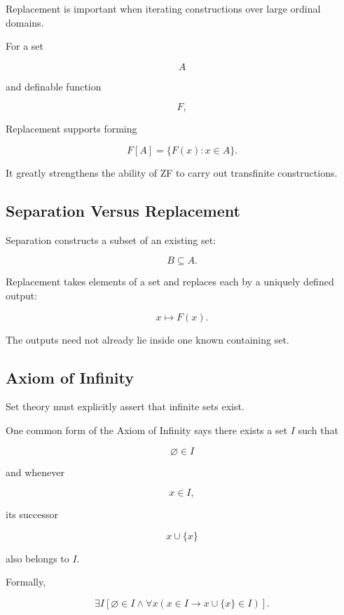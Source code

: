 Replacement is important when iterating constructions over large ordinal
domains.

For a set

\[
A
\]

and definable function

\[
F,
\]

Replacement supports forming

\[
\boxed{
F[A]
=
\{F(x):x\in A\}.
}
\]

It greatly strengthens the ability of ZF to carry out transfinite
constructions.

\subsection{Separation Versus Replacement}
\label{subsec:separation-vs-replacement}

Separation constructs a subset of an existing set:

\[
\boxed{
B
\subseteq
A.
}
\]

Replacement takes elements of a set and replaces each by a uniquely
defined output:

\[
\boxed{
x
\mapsto
F(x).
}
\]

The outputs need not already lie inside one known containing set.

\subsection{Axiom of Infinity}
\label{subsec:axiom-infinity}

Set theory must explicitly assert that infinite sets exist.

One common form of the Axiom of Infinity says there exists a set \(I\) such
that

\[
\boxed{
\varnothing\in I
}
\]

and whenever

\[
x\in I,
\]

its successor

\[
\boxed{
x\cup\{x\}
}
\]

also belongs to \(I\).

Formally,

\[
\boxed{
\exists I
\left[
\varnothing\in I
\land
\forall x
\left(
x\in I
\rightarrow
x\cup\{x\}\in I
\right)
\right].
}
\]

